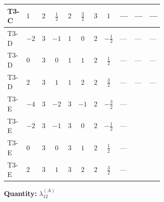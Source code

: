 \documentclass[8pt]{article}
\begin{document}
\begin{landscape}
\begin{longtable}{@{}llcccccc >{\raggedright\arraybackslash}p{0.21\linewidth} >{\raggedright\arraybackslash}p{0.21\linewidth} >{\raggedright\arraybackslash}p{0.21\linewidth}@{}}
\midrule
T3-C & $1$ & $2$ & $\frac{1}{2}$ & $2$ & $\frac{3}{2}$ & $3$ & $1$ & --- & --- & --- \\
\midrule
T3-D & $-2$ & $3$ & $-1$ & $1$ & $0$ & $2$ & $-\frac{1}{2}$ & --- & --- & --- \\
\midrule
T3-D & $0$ & $3$ & $0$ & $1$ & $1$ & $2$ & $\frac{1}{2}$ & --- & --- & --- \\
\midrule
T3-D & $2$ & $3$ & $1$ & $1$ & $2$ & $2$ & $\frac{3}{2}$ & --- & --- & --- \\
\midrule
T3-E & $-4$ & $3$ & $-2$ & $3$ & $-1$ & $2$ & $-\frac{3}{2}$ & --- & \scriptsize\adjustbox{max width=\linewidth}{$\begin{gathered} {\lambda_{12}^{(A)}} \left(2 T_{\nu}^{(1)}+2 T_{\nu}^{(2)}+\frac{16 {\lambda_{12}^{(\times)}}}{3}\right)\end{gathered}$} & \scriptsize\adjustbox{max width=\linewidth}{$\begin{gathered} +16 {\lambda_{12}^{(A)}} {\lambda_{S_1}^{(A)}}\end{gathered}$} \\
\midrule
T3-E & $-2$ & $3$ & $-1$ & $3$ & $0$ & $2$ & $-\frac{1}{2}$ & --- & \scriptsize\adjustbox{max width=\linewidth}{$\begin{gathered} {\lambda_{12}^{(A)}} \left(2 T_{\nu}^{(1)}+2 T_{\nu}^{(2)}+\frac{16 {\lambda_{12}^{(\times)}}}{3}\right)\end{gathered}$} & \scriptsize\adjustbox{max width=\linewidth}{$\begin{gathered} +16 {\lambda_{12}^{(A)}} {\lambda_{S_1}^{(A)}}\end{gathered}$} \\
\midrule
T3-E & $0$ & $3$ & $0$ & $3$ & $1$ & $2$ & $\frac{1}{2}$ & --- & \scriptsize\adjustbox{max width=\linewidth}{$\begin{gathered} {\lambda_{12}^{(A)}} \left(2 T_{\nu}^{(1)}+2 T_{\nu}^{(2)}+\frac{16 {\lambda_{12}^{(\times)}}}{3}\right)\end{gathered}$} & \scriptsize\adjustbox{max width=\linewidth}{$\begin{gathered} +16 {\lambda_{12}^{(A)}} {\lambda_{S_1}^{(A)}}\end{gathered}$} \\
\midrule
T3-E & $2$ & $3$ & $1$ & $3$ & $2$ & $2$ & $\frac{3}{2}$ & --- & \scriptsize\adjustbox{max width=\linewidth}{$\begin{gathered} {\lambda_{12}^{(A)}} \left(2 T_{\nu}^{(1)}+2 T_{\nu}^{(2)}+\frac{16 {\lambda_{12}^{(\times)}}}{3}\right)\end{gathered}$} & \scriptsize\adjustbox{max width=\linewidth}{$\begin{gathered} +16 {\lambda_{12}^{(A)}} {\lambda_{S_1}^{(A)}}\end{gathered}$} \\
\midrule
\bottomrule
\end{longtable}
\clearpage
\noindent\textbf{Quantity: }$\lambda_{12}^{(A)}$\par\smallskip

\end{landscape}
\end{document}
